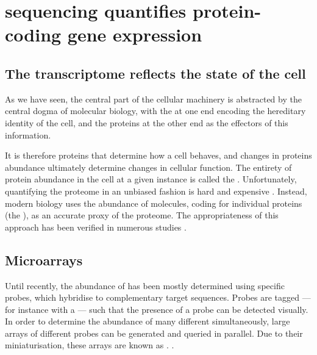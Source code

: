 \section{ sequencing quantifies protein-coding gene expression}

\subsection{The transcriptome reflects the state of the cell}

As we have seen, the central part of the cellular machinery is abstracted by the
central dogma of molecular biology, with the \dna at one end encoding the
hereditary identity of the cell, and the proteins at the other end as the
effectors of this information.

It is therefore proteins that determine how a cell behaves, and changes in
proteins abundance ultimately determine changes in cellular function. The
entirety of protein abundance in the cell at a given instance is called the
. Unfortunately, quantifying the proteome in an unbiased
fashion is hard and expensive \citep{Graumann:2008}. Instead, modern biology
uses the abundance of \mrna molecules, coding for individual proteins (the
), as an accurate proxy of the proteome.
The appropriateness of this approach has been verified in numerous
studies \citep{Nagaraj:2011,Nookaew:2012}.

\subsection{Microarrays}

Until recently, the abundance of \mrna has been mostly determined using specific
probes, which hybridise to complementary target \mrna sequences. Probes are
tagged --- for instance with a  ---
such that the presence of a probe can be detected visually. In order to
determine the abundance of many different \mrna[s] simultaneously, large arrays
of different probes can be generated and queried in parallel. Due to their
miniaturisation, these arrays are known as .
\citep{Schena:1995}.

